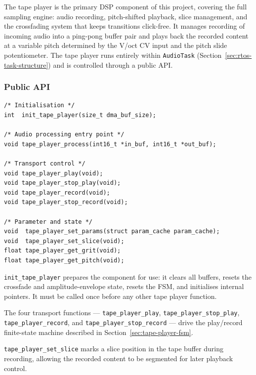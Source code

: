 The tape player is the primary DSP component of this project, covering the full sampling engine: audio recording, pitch-shifted playback, slice management, and the crossfading system that keeps transitions click-free.
It manages recording of incoming audio into a ping-pong buffer pair and plays back the recorded content at a variable pitch determined by the V/oct CV input and the pitch slide potentiometer.
The tape player runs entirely within \texttt{AudioTask} (Section~\ref{sec:rtos-task-structure}) and is controlled through a public API.

\subsubsection{Public API}
\label{sec:tape-player-api}

\begin{listing}[H]
\begin{verbatim}
/* Initialisation */
int  init_tape_player(size_t dma_buf_size);

/* Audio processing entry point */
void tape_player_process(int16_t *in_buf, int16_t *out_buf);

/* Transport control */
void tape_player_play(void);
void tape_player_stop_play(void);
void tape_player_record(void);
void tape_player_stop_record(void);

/* Parameter and state */
void  tape_player_set_params(struct param_cache param_cache);
void  tape_player_set_slice(void);
float tape_player_get_grit(void);
float tape_player_get_pitch(void);
\end{verbatim}
\caption{Tape player public API (\texttt{tape\_player.h})}
\label{lst:tape-player-api}
\end{listing}

\texttt{init\_tape\_player} prepares the component for use: it clears all buffers, resets the crossfade and amplitude-envelope state, resets the FSM, and initialises internal pointers. 
It must be called once before any other tape player function.

The four transport functions --- \texttt{tape\_player\_play}, \texttt{tape\_player\_stop\_play}, \texttt{tape\_player\_record}, and \texttt{tape\_player\_stop\_record} --- drive the play/record finite-state machine described in Section~\ref{sec:tape-player-fsm}.

\texttt{tape\_player\_set\_slice} marks a slice position in the tape buffer during recording, allowing the recorded content to be segmented for later playback control.

